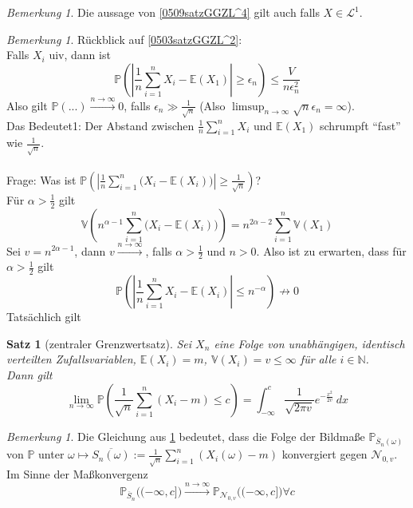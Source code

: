 \documentclass[10pt,a4paper]{article}
\newcommand{\N}{\ensuremath{\mathbb{N}}}
\newcommand{\al}{\ensuremath{\alpha}}
\newcommand{\ol}[1]{\overline{#1}}
\newcommand{\abs}[1]{\left|#1\right|}
\newcommand{\Prb}{\mathbb P}
\newcommand{\Epv}{\ensuremath{\mathbb{E}}}
\newcommand{\Var}{\mathbb{V}}
\newcommand{\scL}{\mathscr L}
\newcommand{\Nv}{\mathscr N}
\theoremstyle{plain}
\newtheorem{satz}[theorem]{Satz}
\theoremstyle{definition}
\theoremstyle{remark}
\newtheorem{bem}[theorem]{Bemerkung}
\begin{document}
	\begin{bem}
		Die aussage von \ref{0509satzGGZL^4} gilt auch falls $X\in\scL^1$.
	\end{bem}

	\begin{bem}
		Rückblick auf \ref{0503satzGGZL^2}:\\
		Falls $X_i$ uiv, dann ist
		\[\Prb\left(\abs{\frac{1}{n}\sum_{i=1}^{n}X_i-\Epv(X_1)}\geq \epsilon_n\right)\leq\frac{V}{n\epsilon_n^2}\]
		Also gilt $\Prb(...)\xrightarrow{n\to\infty}0$, falls $\epsilon_n\gg\frac{1}{\sqrt{n}}$ (Also $\limsup_{n\to\infty}\sqrt{n}\epsilon_n=\infty$).\\
		Das Bedeutet1: Der Abstand zwischen $\frac{1}{n}\sum_{i=1}^{n}X_i$ und $\Epv(X_1)$ schrumpft \enquote{fast} wie $\frac{1}{\sqrt{n}}$.\\
		\\
		Frage: Was ist $\Prb\left(\abs{\frac{1}{n}\sum_{i=1}^{n}\big(X_i-\Epv(X_i)\big)}\geq\frac{1}{\sqrt{n}}\right)$?\\
		Für $\al>\frac{1}{2}$ gilt
		\[\Var\left(n^{\al-1}\sum_{i=1}^{n}\big(X_i-\Epv(X_i)\big)\right)=n^{2\al-2}\sum_{i=1}^{n}\Var(X_1)\]
		Sei $v=n^{2\al-1}$, dann $v\xrightarrow{n\to\infty}$, falls $\al>\frac{1}{2}$ und $n>0$.
		Also ist zu erwarten, dass für $\al>\frac{1}{2}$ gilt
		\[\Prb\left(\abs{\frac{1}{n}\sum_{i=1}^{n}X_i-\Epv(X_i)}\leq n^{-\al}\right)\not\to 0\]
		Tatsächlich gilt
	\end{bem}

	\begin{satz}[zentraler Grenzwertsatz]\label{0512satzZentrGrenzw}
		Sei $X_n$ eine Folge von unabhängigen, identisch verteilten Zufallsvariablen, $\Epv(X_i)=m$, $\Var(X_i)=v\leq\infty$ für alle $i\in\N$.\\
		Dann gilt
		\[\lim\limits_{n\to\infty}\Prb\left(\frac{1}{\sqrt{n}}\sum_{i=1}^{n}(X_i-m)\leq c\right)=\int_{-\infty}^{c}\frac{1}{\sqrt{2\pi v}}e^{-\frac{x^2}{2v}}~dx\]
	\end{satz}

	\begin{bem}
		Die Gleichung aus \ref{0512satzZentrGrenzw} bedeutet, dass die Folge der Bildmaße $\Prb_{\ol S_n(\omega)}$ von $\Prb$ unter $\omega\mapsto\ol{S_n(\omega)}:=\frac{1}{\sqrt{n}}\sum_{i=1}^{n}(X_i(\omega)-m)$
		konvergiert gegen $\Nv_{0,v}$.
		Im Sinne der Maßkonvergenz
		\[\Prb_{\ol S_n}\big((-\infty,c]\big)\xrightarrow{n\to\infty}\Prb_{\Nv_{0,v}}\big((-\infty,c]\big)\forall c\]
	\end{bem}
\end{document}
